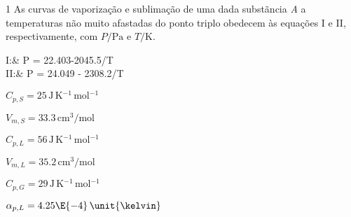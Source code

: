 \documentclass[\mainfilename]{subfiles}
\begin{document}
\begin{questionBox}1{ %
    As curvas de vaporização e sublimação de uma dada substãncia \textit{A} a temperaturas não muito afastadas do ponto triplo obedecem às equações I e II, respectivamente, com \(P/\unit{\pascal}\text{ e }T/\unit{\kelvin}\).
} %
    
    \begin{BM}[align*]
         I:\quad & \ln P = 22.403-2045.5/T\\
        II:\quad & \ln P = 24.049 - 2308.2/T
    \end{BM}

    \begin{itemize}
        \begin{multicols}{3}
           \item \(C_{p,S} = 25\,\unit{\joule\,\kelvin^{-1}\,\mole^{-1}}\)
           \item \(V_{m,S} = 33.3\,\unit{\centi\metre^3/\mole}\)
           \item \(C_{p,L} = 56\,\unit{\joule\,\kelvin^{-1}\,\mole^{-1}}\)
           \item \(V_{m,L} = 35.2\,\unit{\centi\metre^3/\mole}\)
           \item \(C_{p,G} = 29\,\unit{\joule\,\kelvin^{-1}\,\mole^{-1}}\)
           \item \(\alpha_{p,L} = 4.25\E{-4}\,\unit{\kelvin}\)
        \end{multicols}
    \end{itemize}

        
        

    
\end{questionBox}
\end{document}
